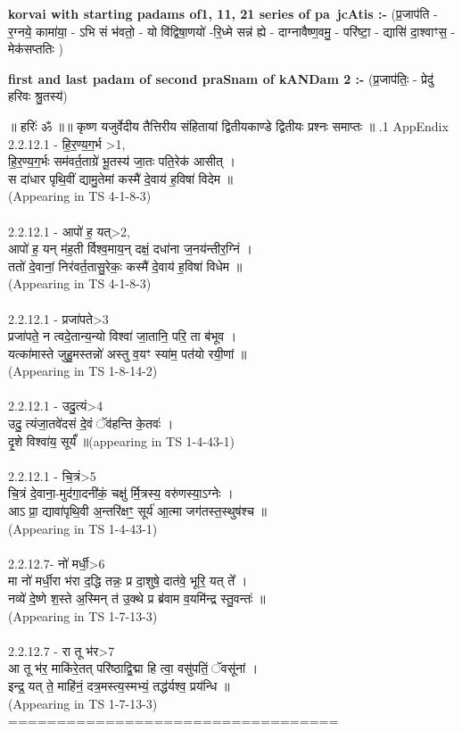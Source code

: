 \documentclass[17pt]{extarticle}
\begin{document}
\textbf{korvai with starting padams of1, 11, 21 series of pa~jcAtis :-} \newline
(प्र॒जाप॑ति - र॒ग्नये॒ कामा॑या॒ - ऽभि सं भ॑वतो॒ - यो वि॑द्विषा॒णयो॑ -रि॒ध्मे सन्न॑ ह्ये - दाग्नावैष्ण॒वमु॒ - परि॑ष्टा॒ - द्यासि॑ दा॒श्वाꣳस॒ - मेक॑सप्ततिः ) \newline

\textbf{first and last padam of second praSnam of kANDam 2 :-} \newline
(प्र॒जाप॑तिः॒ - प्रेदु॑ हरिवः श्रु॒तस्य॑) \newline 


॥ हरिः॑ ॐ ॥॥ कृष्ण यजुर्वेदीय तैत्तिरीय संहितायां द्वितीयकाण्डे द्वितीयः प्रश्नः समाप्तः ॥ \newline
{}.1    AppEndix\\2.2.12.1 - हि॒र॒ण्य॒ग॒र्भ >1,\\हि॒र॒ण्य॒ग॒र्भः सम॑वर्त॒ताग्रे॑ भू॒तस्य॑ जा॒तः पति॒रेक॑ आसीत् ।\\स दा॑धार पृथि॒वीं द्यामु॒तेमां कस्मै॑ दे॒वाय॑ ह॒विषा॑ विदेम ॥\\(Appearing in TS 4-1-8-3)\\\\2.2.12.1 - आपो॑ ह॒ यत्>2, \\आपो॑ ह॒ यन् म॑ह॒ती र्विश्व॒माय॒न् दक्षं॒ दधा॑ना ज॒नय॑न्तीर॒ग्निं ।\\ततो॑ दे॒वानां॒ निर॑वर्त॒तासु॒रेकः॒ कस्मै॑ दे॒वाय॑ ह॒विषा॑ विधेम ॥\\(Appearing in TS 4-1-8-3)\\\\2.2.12.1 - प्रजा॑पते>3\\प्रजा॑पते॒ न त्वदे॒तान्य॒न्यो विश्वा॑ जा॒तानि॒ परि॒ ता ब॑भूव । \\यत्का॑मास्ते जुहु॒मस्तन्नो॑ अस्तु व॒यꣳ स्या॑म॒ पत॑यो रयी॒णां ॥\\(Appearing in TS 1-8-14-2)\\\\2.2.12.1 - उदु॒त्यं>4\\उदु॒ त्यंजा॒तवे॑दसं दे॒वं ॅव॑हन्ति के॒तवः॑ । \\दृ॒शे विश्वा॑य॒ सूर्यं᳚ ॥(appearing in TS 1-4-43-1)\\\\2.2.12.1 - चि॒त्रं>5\\चि॒त्रं दे॒वाना॒-मुद॑गा॒दनी॑कं॒ चक्षु॑ र्मि॒त्रस्य॒ वरु॑णस्या॒ऽग्नेः । \\आऽ प्रा॒ द्यावा॑पृथि॒वी अ॒न्तरि॑क्षꣳ॒॒ सूर्य॑ आ॒त्मा जग॑तस्त॒स्थुष॑श्च ॥\\(Appearing in TS 1-4-43-1)\\\\2.2.12.7- नो॑ मर्धी॒>6\\मा नो॑ मर्धी॒रा भ॑रा द॒द्धि तन्नः॒ प्र दा॒शुषे॒ दात॑वे॒ भूरि॒ यत् ते᳚ । \\नव्ये॑ दे॒ष्णे श॒स्ते अ॒स्मिन् त॑ उ॒क्थे प्र ब्र॑वाम व॒यमि॑न्द्र स्तु॒वन्तः॑ ॥\\(Appearing in TS 1-7-13-3)\\\\2.2.12.7 - रा तू भ॑र>7\\आ तू भ॑र॒ माकि॑रे॒तत् परि॑ष्ठाद्वि॒द्मा हि त्वा॒ वसु॑पतिं॒ ॅवसू॑नां । \\इन्द्र॒ यत् ते॒ माहि॑नं॒ दत्र॒मस्त्य॒स्मभ्यं॒ तद्ध॑र्यश्व॒ प्रय॑न्धि ॥\\(Appearing in TS 1-7-13-3)\\==================================\\
\pagebreak
        
\end{document}
